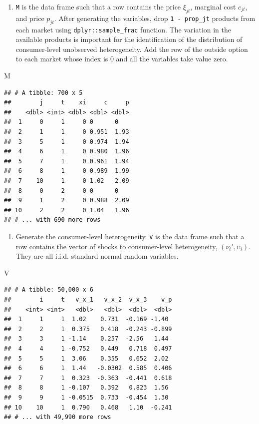\documentclass[]{book}
\newenvironment{Shaded}{\begin{snugshade}}{\end{snugshade}}
\newcommand{\NormalTok}[1]{#1}
\providecommand{\tightlist}{%
  \setlength{\itemsep}{0pt}\setlength{\parskip}{0pt}}
\begin{document}
\begin{enumerate}
\def\labelenumi{\arabic{enumi}.}
\setcounter{enumi}{2}
\tightlist
\item
  \texttt{M} is the data frame such that a row contains the price
  \(\xi_{jt}\), marginal cost \(c_{jt}\), and price \(p_{jt}\). After
  generating the variables, drop \texttt{1\ -\ prop\_jt} products from
  each market using \texttt{dplyr::sample\_frac} function. The variation
  in the available products is important for the identification of the
  distribution of consumer-level unobserved heterogeneity. Add the row
  of the outside option to each market whose index is \(0\) and all the
  variables take value zero.
\end{enumerate}

\begin{Shaded}
\begin{Highlighting}[]
\NormalTok{M}
\end{Highlighting}
\end{Shaded}

\begin{verbatim}
## # A tibble: 700 x 5
##        j     t    xi     c     p
##    <dbl> <int> <dbl> <dbl> <dbl>
##  1     0     1     0 0      0   
##  2     1     1     0 0.951  1.93
##  3     5     1     0 0.974  1.94
##  4     6     1     0 0.980  1.96
##  5     7     1     0 0.961  1.94
##  6     8     1     0 0.989  1.99
##  7    10     1     0 1.02   2.09
##  8     0     2     0 0      0   
##  9     1     2     0 0.988  2.09
## 10     2     2     0 1.04   1.96
## # ... with 690 more rows
\end{verbatim}

\begin{enumerate}
\def\labelenumi{\arabic{enumi}.}
\setcounter{enumi}{3}
\tightlist
\item
  Generate the consumer-level heterogeneity. \texttt{V} is the data
  frame such that a row contains the vector of shocks to consumer-level
  heterogeneity, \((\nu_{i}', \upsilon_i)\). They are all i.i.d.
  standard normal random variables.
\end{enumerate}

\begin{Shaded}
\begin{Highlighting}[]
\NormalTok{V}
\end{Highlighting}
\end{Shaded}

\begin{verbatim}
## # A tibble: 50,000 x 6
##        i     t   v_x_1   v_x_2  v_x_3    v_p
##    <int> <int>   <dbl>   <dbl>  <dbl>  <dbl>
##  1     1     1  1.02    0.731  -0.169 -1.40 
##  2     2     1  0.375   0.418  -0.243 -0.899
##  3     3     1 -1.14    0.257  -2.56   1.44 
##  4     4     1 -0.752   0.449   0.718  0.497
##  5     5     1  3.06    0.355   0.652  2.02 
##  6     6     1  1.44   -0.0302  0.585  0.406
##  7     7     1  0.323  -0.363  -0.441  0.618
##  8     8     1 -0.107   0.392   0.823  1.56 
##  9     9     1 -0.0515  0.733  -0.454  1.30 
## 10    10     1  0.790   0.468   1.10  -0.241
## # ... with 49,990 more rows
\end{verbatim}
\end{document}

